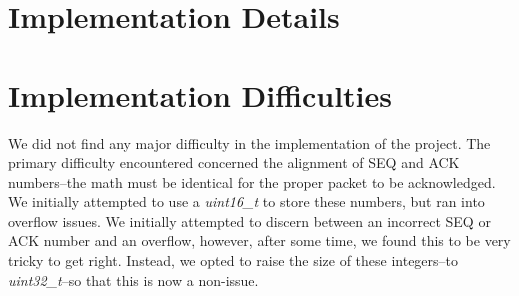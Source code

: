 \documentclass[12pt]{article}
\begin{document}
\maketitle

\section{Implementation Details}

\section{Implementation Difficulties}
We did not find any major difficulty in the implementation of the project. The primary difficulty encountered concerned the alignment of SEQ and ACK numbers--the math must be identical for the proper packet to be acknowledged. We initially attempted to use a \emph{uint16\_t} to store these numbers, but ran into overflow issues. We initially attempted to discern between an incorrect SEQ or ACK number and an overflow, however, after some time, we found this to be very tricky to get right. Instead, we opted to raise the size of these integers--to \emph{uint32\_t}--so that this is now a non-issue.
\end{document}
